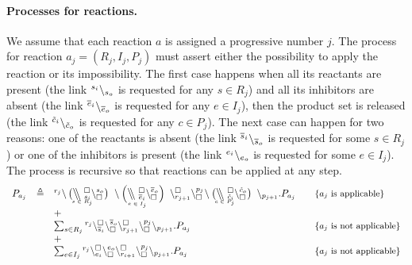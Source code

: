 \paragraph{Processes for reactions.}
We assume that each reaction $a$ is assigned a progressive number $j$.
The process for reaction $a_j=(R_j,I_j,P_j)$ must assert either the possibility to apply the reaction or its impossibility.
The first case happens when all its reactants are present (the link ${}^{s_i} \backslash_{s_o}$ is requested for any $s\in R_j$) and all its inhibitors are absent (the link ${}^{\overline{e}_i} \backslash_{\overline{e}_o}$ is requested for any $e\in I_j$), then the product set is released (the link ${}^{\tilde{c}_i} \backslash_{\tilde{c}_o}$ is requested for any $c\in P_j$).
The next case can happen for two reasons: one of the reactants is absent (the link ${}^{\overline{s}_i} \backslash_{\overline{s}_o}$ is requested for some $s\in R_j$) or one of the inhibitors is present (the link ${}^{e_i} \backslash_{e_o}$ is requested for some $e\in I_j$).
The process is recursive so that reactions can be applied at any step.
\[
\begin{array}{lcl@{\quad}l}
P_{a_j}& \defeq & 
 ^{r_j} \backslash  \blockchain{s_i}{s_o}{s \in R_j} \, \link{}{} \blockchain{\overline{e}_i}{\overline{e}_o}{e \in I_j} \, \chainedlink{r_{j+1}}{\noact}\chainedlink{\noact}{p_j}\link{}{} \blockchain{\tilde{c}_i}{\tilde{c}_o}{c \in P_j}\, \backslash_{p_{j+1}}.P_{a_j} & \mbox{\small  \{$a_j$ is applicable\}}\\
&& + \ \\
&& \sum_{s\in R_j}\startchain{r_j}\chainedlink{\overline{s}_i}{\noact}\chainedlink{\noact}{\overline{s}_o} \chainedlink{r_{j+1}}{\noact}\chainedlink{\noact}{p_{j}}\chainend{p_{j+1}}.P_{a_j}  & \mbox{\small  \{$a_j$ is not applicable\}}\\
&&+\\
&& \sum_{e\in I_j}\startchain{r_j}\chainedlink{e_i}{\noact} \chainedlink{\noact}{e_o} \chainedlink{r_{i+1}}{\noact}\chainedlink{\noact}{p_{j}}\chainend{p_{j+1}}.P_{a_j}  & \mbox{\small \{$a_j$ is not applicable\}}\\
\end{array}
\]

